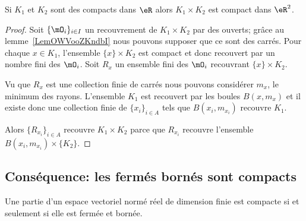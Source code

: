 \begin{lemma}\label{LemCKBooXkwkte}
    Si \( K_1\) et \( K_2\) sont des compacts dans \( \eR\) alors \( K_1\times K_2\) est compact dans \( \eR^2\).
\end{lemma}

\begin{proof}
    Soit \( \{ \mO_i \}_{i\in I}\) un recouvrement de \( K_1\times K_2\) par des ouverts; grâce au lemme~\ref{LemOWVooZKndbI} nous pouvons supposer que ce sont des carrés. Pour chaque \( x\in K_1\), l'ensemble \( \{ x \}\times K_2\) est compact et donc recouvert par un nombre fini des \( \mO_i\). Soit \( R_x\) un ensemble fini des \( \mO_i\) recouvrant \( \{ x \}\times K_2\).

    Vu que \( R_x\) est une collection finie de carrés nous pouvons considérer \( m_x\), le minimum des rayons. L'ensemble \( K_1\) est recouvert par les boules \( B(x,m_x)\) et il existe donc une collection finie de \( \{ x_i \}_{i\in A}\) tels que \( B(x_i,m_{x_i})\) recouvre \( K_1\).

    Alors \( \{ R_{x_i} \}_{i\in A}\) recouvre \( K_1\times K_2\) parce que \( R_{x_i}\) recouvre l'ensemble \( B(x_i,m_{x_i})\times \{ K_2 \}\).
\end{proof}

\subsection{Conséquence: les fermés bornés sont compacts}

\begin{theorem} \label{ThoXTEooxFmdI}
    Une partie d'un espace vectoriel normé réel de dimension finie est compacte si et seulement si elle est fermée et bornée.
\end{theorem}


